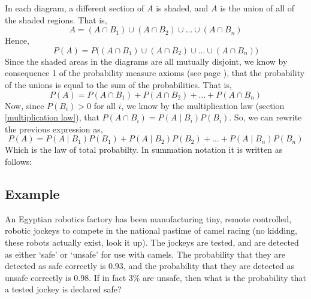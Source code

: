 \noindent In each diagram, a different section of $A$ is shaded, and $A$ is the union of all of the shaded regions. That is,
\[
A = (A \cap B_1) \cup (A \cap B_2) \cup \ldots \cup (A \cap B_n)
\]
Hence,
\[
P(A) = P\big( (A \cap B_1) \cup (A \cap B_2) \cup \ldots \cup (A \cap B_n) \big)
\]
Since the shaded areas in the diagrams are all mutually disjoint, we know by consequence 1 of the probability measure axioms (see page \pageref{consequence1}), that the probability of the unions is equal to the sum of the probabilities. That is,
\[
P(A) = P(A \cap B_1) + P(A \cap B_2) + \ldots + P(A \cap B_n)
\]
Now, since $P(B_i) > 0$ for all $i$, we know by the multiplication law (section \ref{multiplication law}), that $P(A \cap B_i) = P(A \! \mid \! B_i)P(B_i)$. So, we can rewrite the previous expression as,
\[
P(A) = P(A \! \mid \! B_1)P(B_1) + P(A \! \mid \! B_2)P(B_2) + \ldots + P(A \! \mid \! B_n)P(B_n)
\]
Which is the law of total probabilty. In summation notation it is written as follows: \\

\bigskip
\hfil{}
\bigskip


\subsection{Example} \label{exjockey}
An Egyptian robotics factory has been manufacturing tiny, remote controlled, robotic jockeys to compete in the national pastime of camel racing (no kidding, these robots actually exist, look it up).  The jockeys are tested, and are detected as either `safe' or `unsafe' for use with camels. The probability that they are detected as safe correctly is $0.93$, and the probability that they are detected as unsafe correctly is $0.98$. If in fact $3\%$ are unsafe, then what is the probability that a tested jockey is declared safe? \\


